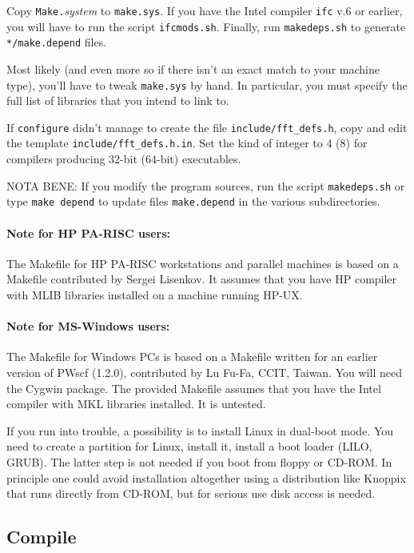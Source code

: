 \documentclass[12pt,a4paper]{article}
\begin{document}
Copy \texttt{Make.}\emph{system} to \texttt{make.sys}. If you
have the Intel compiler \texttt{ifc} v.6 or earlier, you will have
to run the script \texttt{ifcmods.sh}. Finally, run
\texttt{makedeps.sh} to generate \texttt{*/make.depend} files.

Most likely (and even more so if there isn't an exact match to your
machine type), you'll have to tweak \texttt{make.sys} by hand.
In particular, you must specify the full list of libraries that
you intend to link to.

If \texttt{configure} didn't manage to create the file 
\texttt{include/fft\_defs.h}, copy and edit the template 
\texttt{include/fft\_defs.h.in}. 
Set the kind of integer to 4 (8) for compilers producing
32-bit (64-bit) executables.

NOTA BENE: If you modify the program sources, run the script
\texttt{makedeps.sh} or type \texttt{make depend} to update
files \texttt{make.depend} in the various subdirectories. 

\paragraph{Note for HP PA-RISC users:} 

The Makefile for HP PA-RISC workstations and parallel machines is
based on a Makefile contributed by Sergei Lisenkov.
It assumes that you have HP compiler with MLIB libraries installed on
a machine running HP-UX.

\paragraph{Note for MS-Windows users:} 

The Makefile for Windows PCs is based on a Makefile written for an
earlier version of PWscf (1.2.0), contributed by Lu Fu-Fa, CCIT,
Taiwan. You will need the Cygwin package. The provided Makefile
assumes that you have the Intel compiler with MKL libraries installed.
It is untested.

If you run into trouble, a possibility is to install Linux in 
dual-boot mode. You need to create a partition for Linux, 
install it, install a boot loader (LILO, GRUB). The latter step
is not needed if you boot from floppy or CD-ROM. In principle 
one could avoid installation altogether using a distribution 
like Knoppix that runs directly from CD-ROM, but for serious use 
disk access is needed.

\subsection{Compile}
\end{document}
